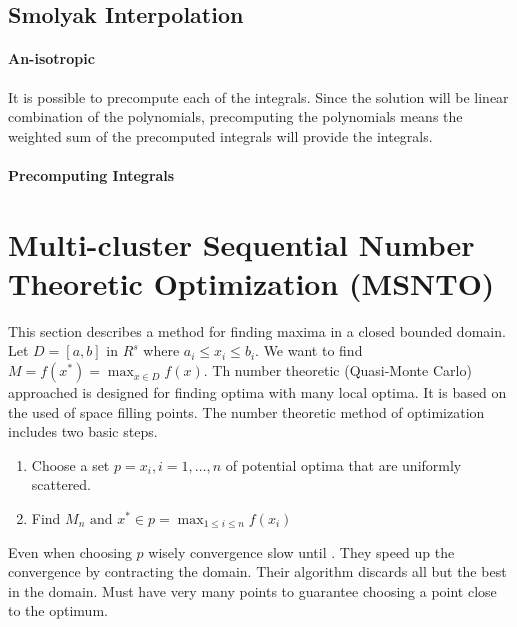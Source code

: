 \documentclass[12pt]{article}
\begin{document}
\subsection{Smolyak Interpolation}
\label{sec:smolyakinterp}

\paragraph{An-isotropic}
It is possible to precompute each of the integrals. Since the solution will be linear combination of the polynomials, precomputing the polynomials means the weighted sum of the precomputed integrals will provide the integrals.
\paragraph{Precomputing Integrals}
\begin{algorithm}
\Input{$\aSmolPoly$, $\smolRngs$, $\distribSpec$} 
\end{algorithm}







\section{Multi-cluster Sequential Number Theoretic Optimization (MSNTO)}
\label{sec:MSNTO}

This section describes a method for finding maxima in a closed bounded domain.
Let $D=[a,b]$ in $R^s$ where $a_i \le x_i \le b_i$. We want to find  $M=f(x^\ast)= \max_{x \in D}f(x)$.
Th number theoretic (Quasi-Monte Carlo) approached is designed for finding optima with many local optima.  It is based on the used of space filling points.\cite{Xu2005}
The number theoretic method of optimization includes two basic steps.
\begin{enumerate}
\item Choose a set $p=x_i, i=1,\dots,n$ of potential optima that are uniformly scattered.
\item Find $M_n\text{ and } x^\ast \in p =\max_{1\le i \le n}f(x_i)$
\end{enumerate}

Even when choosing $p$ wisely convergence slow until \cite{Niederreiter1983}.  They speed up the convergence by contracting the domain.
Their algorithm discards all but the best in the domain. Must have very many points to guarantee choosing a point close to the optimum.
\end{document}
